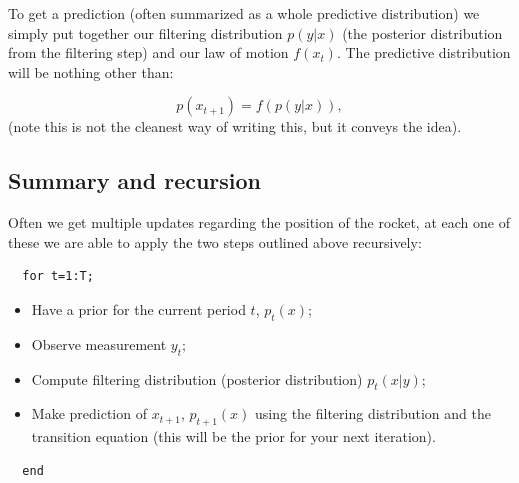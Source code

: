 \documentclass[11pt]{article}
\theoremstyle{definition}
\begin{document}
\begin{itemize}
  To get a prediction (often summarized as a whole predictive distribution) we simply put together our filtering distribution $p(y|x)$ (the posterior distribution from the filtering step) and our law of motion $f(x_{t})$. The predictive distribution will be nothing other than:

  \begin{equation}
    p(x_{t+1}) = f(p(y|x)),
  \end{equation}
(note this is not the cleanest way of writing this, but it conveys the idea).

\end{itemize}

\subsection{Summary and recursion}
Often we get multiple updates regarding the position of the rocket, at each one of these we are able to apply the two steps outlined above recursively:

\begin{lstlisting}  
  for t=1:T;
\end{lstlisting}
  \begin{itemize}
  \item Have a prior for the current period $t$, $p_{t}(x)$;
  \item Observe measurement $y_{t}$;
  \item Compute filtering distribution (posterior distribution) $p_{t}(x|y)$;
  \item Make prediction of $x_{t+1}$, $p_{t+1}(x)$ using the filtering distribution and the transition equation (this will be the prior for your next iteration).
  \end{itemize}
\begin{lstlisting}  
  end
\end{lstlisting}
\end{document}
